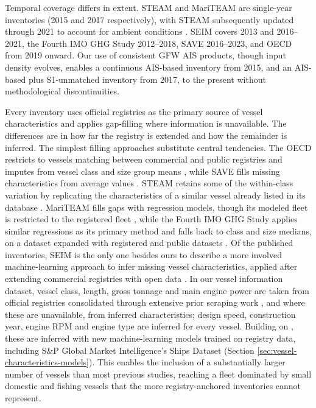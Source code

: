 Temporal coverage differs in extent. STEAM and MariTEAM are single-year inventories (2015 and 2017 respectively), with STEAM subsequently updated through 2021 to account for ambient conditions \cite{majamaki2025improving}. SEIM covers 2013 and 2016--2021, the Fourth IMO GHG Study 2012--2018, SAVE 2016--2023, and OECD from 2019 onward. Our use of consistent GFW AIS products, though input density evolves, enables a continuous AIS-based inventory from 2015, and an AIS-based plus S1-unmatched inventory from 2017, to the present without methodological discontinuities.

Every inventory uses official registries as the primary source of vessel characteristics and applies gap-filling where information is unavailable. The differences are in how far the registry is extended and how the remainder is inferred. The simplest filling approaches substitute central tendencies. The OECD restricts to vessels matching between commercial and public registries and imputes from vessel class and size group means \cite{oecdMaritimeTransportCO2Methodology2025}, while SAVE fills missing characteristics from average values \cite{documentationV2025031Documentation}. STEAM retains some of the within-class variation by replicating the characteristics of a similar vessel already listed in its database \cite{johanssonGlobalAssessmentShipping2017}. MariTEAM fills gaps with regression models, though its modeled fleet is restricted to the registered fleet \cite{kramelGlobalShippingEmissions2021}, while the Fourth IMO GHG Study applies similar regressions as its primary method and falls back to class and size medians, on a dataset expanded with registered and public datasets \cite{fourth2020greenhouse}. Of the published inventories, SEIM is the only one besides ours to describe a more involved machine-learning approach to infer missing vessel characteristics, applied after extending commercial registries with open data \cite{yiHighresolutionGlobalShipping2025}. In our vessel information dataset, vessel class, length, gross tonnage and main engine power are taken from official registries consolidated through extensive prior scraping work \cite{park2023tracking}, and where these are unavailable, from inferred characteristics; design speed, construction year, engine RPM and engine type are inferred for every vessel. Building on \cite{kroodsma2018tracking}, these are inferred with new machine-learning models trained on registry data, including S\&P Global Market Intelligence's Ships Dataset (Section \ref{sec:vessel-characteristics-models}). This enables the inclusion of a substantially larger number of vessels than most previous studies, reaching a fleet dominated by small domestic and fishing vessels that the more registry-anchored inventories cannot represent.

